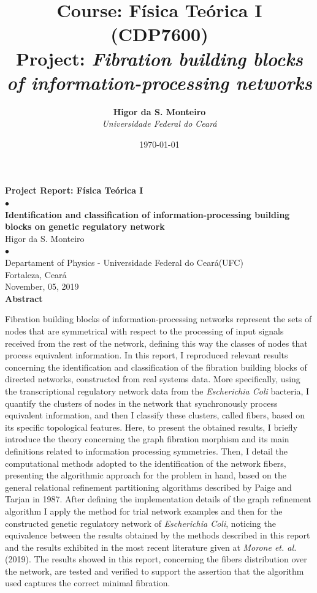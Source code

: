 \documentclass[12pt]{diazessay} %
\title{\textbf{Course: Física Teórica I (CDP7600)} \\[0.2cm] {\Large \textbf{Project}: \hspace{0.2cm}
\textit{Fibration building blocks of information-processing networks}
}}%
\author{\textbf{Higor da S. Monteiro} \\ \textit{Universidade Federal do Ceará}} %
\date{\today} %
\begin{document}

\begin{center}	
	{\LARGE \textbf{Project Report: Física Teórica I}}\\[0.25cm]
	{ $\bullet$ }\\
	\vspace{0.25cm}
	{\large \textbf{Identification and classification of information-processing building blocks on genetic regulatory network}}\\[0.25cm]
	{ Higor da S. Monteiro }\\
	{ $\bullet$ }\\
	{ Departament of Physics - Universidade Federal do Ceará(UFC) }\\
	{ Fortaleza, Ceará }\\
	{ November, 05, 2019 }\\[0.75cm]
	{\textbf{Abstract}}
	
\end{center}

Fibration building blocks of information-processing networks represent the sets of nodes that are symmetrical with respect to the processing of input signals received from the rest of the network, defining this way the classes of nodes that process equivalent information. In this report, I reproduced relevant results concerning the identification and classification of the fibration building blocks of directed networks, constructed from real systems data. More specifically, using the transcriptional regulatory network data from the \textit{Escherichia Coli} bacteria, I quantify the clusters of nodes in the network that synchronously process equivalent information, and then I classify these clusters, called fibers, based on its specific topological features. Here, to present the obtained results, I briefly introduce the theory concerning the graph fibration morphism and its main definitions related to information processing symmetries. Then, I detail the computational methods adopted to the identification of the network fibers, presenting the algorithmic approach for the problem in hand, based on the general relational refinement partitioning algorithms described by Paige and Tarjan in 1987. After defining the implementation details of the graph refinement algorithm I apply the method for trial network examples and then for the constructed genetic regulatory network of \textit{Escherichia Coli}, noticing the equivalence between the results obtained by the methods described in this report and the results exhibited in the most recent literature given at \textit{Morone et. al.} (2019). The results showed in this report, concerning the fibers distribution over the network, are tested and verified to support the assertion that the algorithm used captures the correct minimal fibration.
\end{document}

